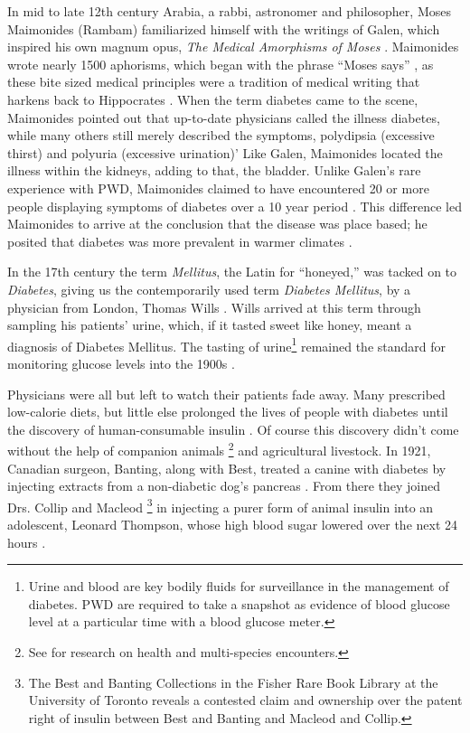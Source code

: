 \documentclass[12pt]{article}
\begin{document}
In mid to late 12th century Arabia, a rabbi, astronomer and philosopher, Moses Maimonides (Rambam) familiarized himself with the writings of Galen, which inspired his own magnum opus, \textit{The Medical Amorphisms of Moses} \citep{maimonides_1989_medical}. Maimonides wrote nearly 1500 aphorisms, which began with the phrase ``Moses says'' \citep{maimonides_1989_medical}, as these bite sized medical principles were a tradition of medical writing that harkens back to Hippocrates \citep{sanders_2001_philatelic}. When the term diabetes came to the scene, Maimonides pointed out that up-to-date physicians called the illness diabetes, while many others still merely described the symptoms, polydipsia (excessive thirst) and polyuria (excessive urination)' Like Galen, Maimonides located the illness within the kidneys, adding to that, the bladder.  Unlike Galen's rare experience with PWD, Maimonides claimed to have encountered 20 or more people displaying symptoms of diabetes over a 10 year period \citep{maimonides_1989_medical}. This difference led Maimonides to arrive at the conclusion that the disease was place based; he posited that diabetes was more prevalent in warmer climates \citep{maimonides_1989_medical}.


In the 17th century the term \textit{Mellitus}, the Latin for ``honeyed,'' was tacked on to \textit{Diabetes}, giving us the contemporarily used term \textit{Diabetes Mellitus}, by a physician from London, Thomas Wills \citep{sattley_history_1996}. Wills arrived at this term through sampling his patients' urine, which, if it tasted sweet like honey, meant a diagnosis of Diabetes Mellitus. The tasting of urine\footnote{Urine and blood are key bodily fluids for surveillance in the management of diabetes. PWD are required to take a snapshot as evidence of blood glucose level at a particular time with a blood glucose meter.} remained the standard for monitoring glucose levels into the 1900s \citep{sattley_history_1996}. 

Physicians were all but left to watch their patients fade away. Many prescribed low-calorie diets, but little else prolonged the lives of people with diabetes until the discovery of human-consumable insulin \citep{ebstein_history_1989}. Of course this discovery didn't come without the help of companion animals \citep{balfe_diabetes_2008}\footnote{See \citet{wilkie_multispecies_2013} for research on health and multi-species encounters.} and agricultural livestock. In 1921, Canadian surgeon, Banting, along with Best, treated a canine with diabetes by injecting extracts from a non-diabetic dog's pancreas \citep{zimmermann_first_1989}. From there they joined Drs. Collip and Macleod \footnote{The Best and Banting Collections in the Fisher Rare Book Library at the University of Toronto reveals a contested claim and ownership over the patent right of insulin between Best and Banting and Macleod and Collip.} in injecting a purer form of animal insulin into an adolescent, Leonard Thompson, whose high blood sugar lowered over the next 24 hours \citep{sattley_history_1996}.  
\end{document}
